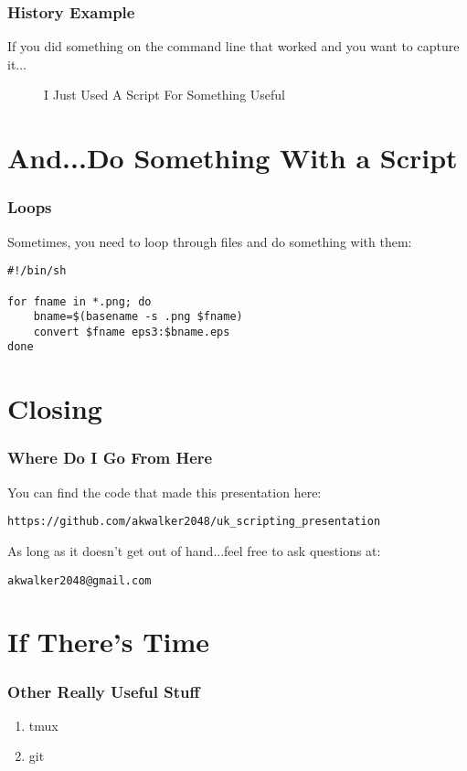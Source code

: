 \documentclass{beamer}
\begin{document}
\begin{frame}\frametitle{History Example}
    If you did something on the command line that worked and you want to capture it...

  \begin{figure}[!htb]
    \linewidth
    \begin{center}
    \end{center}
    \caption{I Just Used A Script For Something Useful}\label{fig:history-grep-example}
  \end{figure}
\end{frame}

\section{And...Do Something With a Script}
\begin{frame}[fragile]\frametitle{Loops}
  Sometimes, you need to loop through files and do something with them:
\begin{verbatim}
#!/bin/sh

for fname in *.png; do
    bname=$(basename -s .png $fname)
    convert $fname eps3:$bname.eps
done
\end{verbatim}
\end{frame}


\section{Closing}
\begin{frame}[fragile]\frametitle{Where Do I Go From Here}
  You can find the code that made this presentation here:
\begin{verbatim}
https://github.com/akwalker2048/uk_scripting_presentation
\end{verbatim}

As long as it doesn't get out of hand...feel free to ask questions at:
\begin{verbatim}
akwalker2048@gmail.com
\end{verbatim}
\end{frame}

\section{If There's Time}
\begin{frame}\frametitle{Other Really Useful Stuff}
  \begin{enumerate}
  \item tmux
  \item git
  \end{enumerate}
\end{frame}
\end{document}
